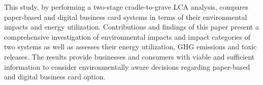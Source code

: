 \documentclass[conference]{IEEEtran}
\begin{document}
This study, by performing a two-stage cradle-to-grave LCA analysis, compares paper-based and digital business card systems in terms of their environmental impacts and energy utilization. Contributions and findings of this paper present a comprehensive investigation of environmental impacts and impact categories of two systems as well as assesses their energy utilization, GHG emissions and toxic releases. The results provide businesses and consumers with viable and sufficient information to consider environmentally aware decisions regarding paper-based and digital business card option.

\end{document}
